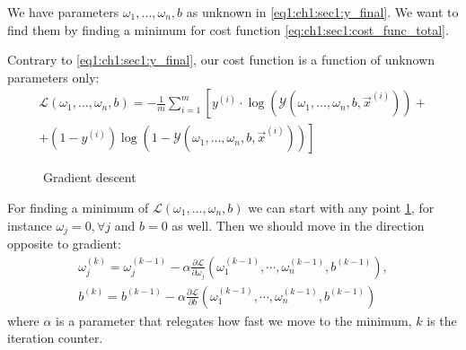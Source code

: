 We have parameters $\omega_1, \dots, \omega_n, b$ as unknown in
\cref{eq1:ch1:sec1:y_final}. We want to find them by finding a minimum for cost
function \cref{eq:ch1:sec1:cost_func_total}.

Contrary to \cref{eq1:ch1:sec1:y_final}, our cost function is a function of
unknown parameters only:
\begin{align}
  \mathcal{L}\left(\omega_1, \dots, \omega_n, b\right) = - \frac{1}{m} \sum_{i =
    1}^{m} \left[ y^{(i)} \cdot \log \left(\mathcal{Y}\left(\omega_1, \dots, \omega_n, b,
    \vec{x}^{(i)}\right)\right) + \right.
    \nonumber \\
    \left. + 
(1-y^{(i)}) \log \left(1 - \mathcal{Y}\left(\omega_1, \dots, \omega_n, b, \vec{x}^{(i)}\right)\right)\right]
  \label{eq:ch1:sec1:cost_func_total_params}
\end{align}

\begin{figure}
  \centering
  \caption{Gradient descent}
  \label{fig:ch1:sec1:gradient_desc}
\end{figure}

For finding a minimum of $\mathcal{L}\left(\omega_1, \dots, \omega_n, b\right)$
we can start with any point \cref{fig:ch1:sec1:gradient_desc}, for instance $\omega_j = 0, \forall j$ and $b = 0$
as well. Then we should move in the direction opposite to gradient:
\begin{align}
  \omega_j^{(k)} = \omega_j^{(k-1)} - \alpha \frac{\partial
    \mathcal{L}}{\partial \omega_j}\left(\omega_1^{(k-1)}, \cdots,
  \omega_n^{(k-1)}, b^{(k-1)}\right),
  \nonumber \\
  b^{(k)} = b^{(k-1)}  - \alpha \frac{\partial
    \mathcal{L}}{\partial b}\left(\omega_1^{(k-1)}, \cdots,
  \omega_n^{(k-1)}, b^{(k-1)}\right)
  \nonumber
\end{align}
where $\alpha$ is a parameter that relegates how fast we move to the minimum,
$k$ is the iteration counter.

